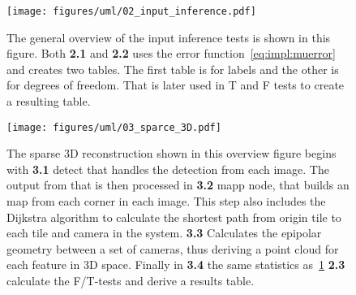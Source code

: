 \begin{figure}
\begin{center}
    \texttt{[image: figures/uml/02\_input\_inference.pdf]}
\end{center}
\caption{The general overview of the input inference tests is shown in this figure.
    Both \textbf{2.1} and \textbf{2.2} uses the error function~\ref{eq:impl:muerror} and creates two tables. The first table is for labels and the other is for degrees of freedom. That is later used in T and F tests to create a resulting table.
}
\label{fig:method:inference}
\end{figure}


\begin{figure}
    \begin{center}
        \texttt{[image: figures/uml/03\_sparce\_3D.pdf]}
    \end{center}
    \caption{The sparse 3D reconstruction shown in this overview figure begins with \textbf{3.1} detect that handles the \aruco{ } detection from each image.
        The output from that is then processed in \textbf{3.2} mapp node, that builds an map from each corner in each image. This step also includes the Dijkstra algorithm to calculate the shortest path from \aruco{ } origin tile to each tile and camera in the system.
        \textbf{3.3} Calculates the epipolar geometry between a set of cameras, thus deriving a point cloud for each feature in 3D space.
        Finally in \textbf{3.4} the same statistics as~\ref{fig:method:inference} \textbf{2.3} calculate the F/T-tests and derive a results table.
    }\label{fig:method:sparce3d}
\end{figure}





